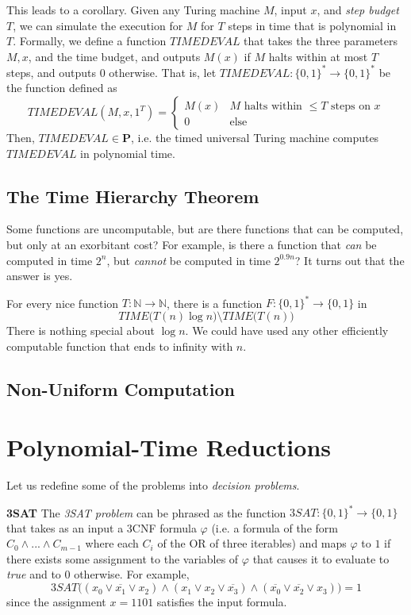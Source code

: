   This leads to a corollary. Given any Turing machine $M$, input $x$, and \textit{step budget} $T$, we can simulate the execution for $M$ for $T$ steps in time that is polynomial in $T$. Formally, we define a function $TIMEDEVAL$ that takes the three parameters $M, x$, and the time budget, and outputs $M(x)$ if $M$ halts within at most $T$ steps, and outputs $0$ otherwise. That is, let $TIMEDEVAL: \{0,1\}^* \longrightarrow \{0,1\}^*$ be the function defined as 
  \[TIMEDEVAL (M, x, 1^T) = \begin{cases}
  M(x) & M \text{ halts within } \leq T \text{ steps on } x \\
  0 & \text{else}
  \end{cases}\]
  Then, $TIMEDEVAL \in \mathbf{P}$, i.e. the timed universal Turing machine computes $TIMEDEVAL$ in polynomial time. 

\subsection{The Time Hierarchy Theorem}

  Some functions are uncomputable, but are there functions that can be computed, but only at an exorbitant cost? For example, is there a function that \textit{can} be computed in time $2^n$, but \textit{cannot} be computed in time $2^{0.9 n}$? It turns out that the answer is yes. 

  \begin{theorem}
  For every nice function $T: \mathbb{N} \longrightarrow \mathbb{N}$, there is a function $F: \{0,1\}^* \longrightarrow \{0,1\}$ in 
  \[TIME \big( T(n) \log n\big) \setminus TIME \big( T(n)\big) \]
  There is nothing special about $\log n$. We could have used any other efficiently computable function that ends to infinity with $n$. 
  \end{theorem}

\subsection{Non-Uniform Computation}

\section{Polynomial-Time Reductions}

  Let us redefine some of the problems into \textit{decision problems}. 

  \textbf{3SAT} The \textit{3SAT problem} can be phrased as the function $3SAT: \{0,1\}^* \longrightarrow \{0,1\}$ that takes as an input a 3CNF formula $\varphi$ (i.e. a formula of the form $C_0 \wedge ... \wedge C_{m-1}$ where each $C_i$ of the OR of three iterables) and maps $\varphi$ to $1$ if there exists some assignment to the variables of $\varphi$ that causes it to evaluate to \textit{true} and to $0$ otherwise. For example, 
  \[3SAT \big( (x_0 \vee \overline{x_1} \vee x_2) \wedge (x_1 \vee x_2 \vee \overline{x_3}) \wedge (\overline{x_0} \vee \overline{x_2} \vee x_3) \big) = 1\]
  since the assignment $x = 1101$ satisfies the input formula. 

